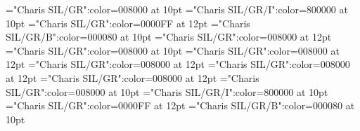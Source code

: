 \documentclass[a4paper,twoside]{article}
\begin{document}
\font\spanesabbreviationvariantentrytypevariantentrytypesvariantformentrybackrefvariantformentrybackrefsentryletDatadicBody="Charis SIL/GR":color=008000 at 10pt
\font\spanabbreviationvariantentrytypevariantentrytypesvariantformentrybackrefvariantformentrybackrefsentryletDatadicBody="Charis SIL/GR/I":color=800000 at 10pt
\font\headwordvariantformentrybackrefvariantformentrybackrefsentryletDatadicBody="Charis SIL/GR":color=0000FF at 12pt
\font\spanmxbheadwordvariantformentrybackrefvariantformentrybackrefsentryletDatadicBody="Charis SIL/GR/B":color=000080 at 10pt
\font\variantformentrybackrefsbentryletDatadicBody="Charis SIL/GR":color=008000 at 12pt
\font\spanvariantformentrybackrefsbentryletDatadicBody="Charis SIL/GR":color=008000 at 10pt
\font\variantformentrybackrefbvariantformentrybackrefsbentryletDatadicBody="Charis SIL/GR":color=008000 at 12pt
\font\variantentrytypesvariantformentrybackrefbvariantformentrybackrefsbentryletDatadicBody="Charis SIL/GR":color=008000 at 12pt
\font\variantentrytypevariantentrytypesvariantformentrybackrefbvariantformentrybackrefsbentryletDatadicBody="Charis SIL/GR":color=008000 at 12pt
\font\abbreviationvariantentrytypevariantentrytypesvariantformentrybackrefbvariantformentrybackrefsbentryletDatadicBody="Charis SIL/GR":color=008000 at 12pt
\font\spanesabbreviationvariantentrytypevariantentrytypesvariantformentrybackrefbvariantformentrybackrefsbentryletDatadicBody="Charis SIL/GR":color=008000 at 10pt
\font\spanabbreviationvariantentrytypevariantentrytypesvariantformentrybackrefbvariantformentrybackrefsbentryletDatadicBody="Charis SIL/GR/I":color=800000 at 10pt
\font\headwordvariantformentrybackrefbvariantformentrybackrefsbentryletDatadicBody="Charis SIL/GR":color=0000FF at 12pt
\font\spanmxbheadwordvariantformentrybackrefbvariantformentrybackrefsbentryletDatadicBody="Charis SIL/GR/B":color=000080 at 10pt
\end{document}
